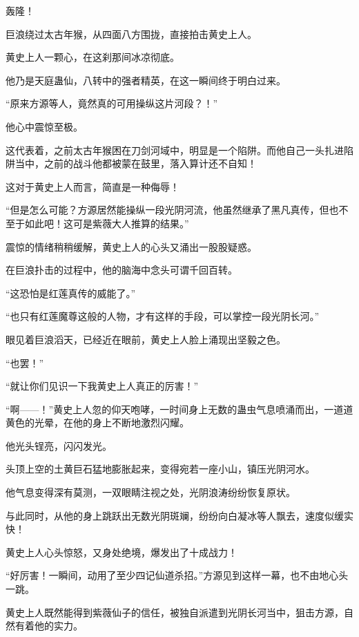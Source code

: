 
\begin{this_body}

轰隆！

巨浪绕过太古年猴，从四面八方围拢，直接拍击黄史上人。

黄史上人一颗心，在这刹那间冰凉彻底。

他乃是天庭蛊仙，八转中的强者精英，在这一瞬间终于明白过来。

“原来方源等人，竟然真的可用操纵这片河段？！”

他心中震惊至极。

这代表着，之前太古年猴困在刀剑河域中，明显是一个陷阱。而他自己一头扎进陷阱当中，之前的战斗他都被蒙在鼓里，落入算计还不自知！

这对于黄史上人而言，简直是一种侮辱！

“但是怎么可能？方源居然能操纵一段光阴河流，他虽然继承了黑凡真传，但也不至于如此吧！这可是紫薇大人推算的结果。”

震惊的情绪稍稍缓解，黄史上人的心头又涌出一股股疑惑。

在巨浪扑击的过程中，他的脑海中念头可谓千回百转。

“这恐怕是红莲真传的威能了。”

“也只有红莲魔尊这般的人物，才有这样的手段，可以掌控一段光阴长河。”

眼见着巨浪滔天，已经近在眼前，黄史上人脸上涌现出坚毅之色。

“也罢！”

“就让你们见识一下我黄史上人真正的厉害！”

“啊——！”黄史上人忽的仰天咆哮，一时间身上无数的蛊虫气息喷涌而出，一道道黄色的光晕，在他的身上不断地激烈闪耀。

他光头锃亮，闪闪发光。

头顶上空的土黄巨石猛地膨胀起来，变得宛若一座小山，镇压光阴河水。

他气息变得深有莫测，一双眼睛注视之处，光阴浪涛纷纷恢复原状。

与此同时，从他的身上跳跃出无数光阴斑斓，纷纷向白凝冰等人飘去，速度似缓实快！

黄史上人心头惊怒，又身处绝境，爆发出了十成战力！

“好厉害！一瞬间，动用了至少四记仙道杀招。”方源见到这样一幕，也不由地心头一跳。

黄史上人既然能得到紫薇仙子的信任，被独自派遣到光阴长河当中，狙击方源，自然有着他的实力。


\end{this_body}
